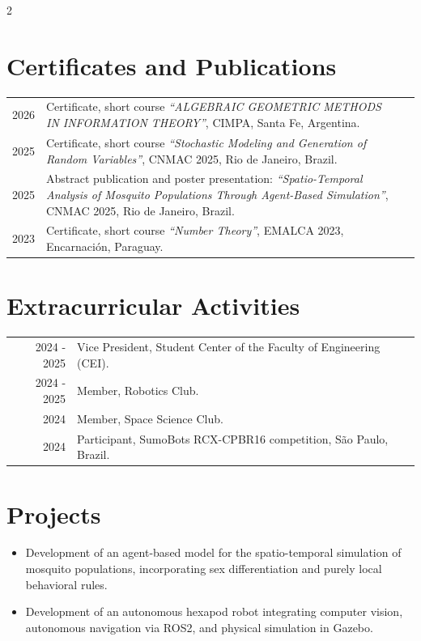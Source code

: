 \documentclass[lighthipster]{simplehipstercv}
\begin{document}
\begin{paracol}{2}
\section*{Certificates and Publications}
\begin{tabular}{r| p{} c}
    2026 & Certificate, short course \textit{``ALGEBRAIC GEOMETRIC METHODS IN INFORMATION THEORY''}, CIMPA, Santa Fe, Argentina. \\
    2025 & Certificate, short course \textit{``Stochastic Modeling and Generation of Random Variables''}, CNMAC 2025, Rio de Janeiro, Brazil. \\
    2025 & Abstract publication and poster presentation: \textit{``Spatio-Temporal Analysis of Mosquito Populations Through Agent-Based Simulation''}, CNMAC 2025, Rio de Janeiro, Brazil. \\
    2023 & Certificate, short course \textit{``Number Theory''}, EMALCA 2023, Encarnación, Paraguay. \\
\end{tabular}

\section*{Extracurricular Activities}
\begin{tabular}{r| p{} c}
    2024 - 2025 & Vice President, Student Center of the Faculty of Engineering (CEI). \\
    2024 - 2025 & Member, Robotics Club. \\
    2024 & Member, Space Science Club. \\
    2024 & Participant, SumoBots RCX-CPBR16 competition, São Paulo, Brazil. \\
\end{tabular}

\section*{Projects}
\begin{itemize}

\item Development of an agent-based model for the spatio-temporal simulation of mosquito populations, incorporating sex differentiation and purely local behavioral rules.

\item Development of an autonomous hexapod robot integrating computer vision, autonomous navigation via ROS2, and physical simulation in Gazebo.


\end{itemize}
\end{paracol}
\end{document}
